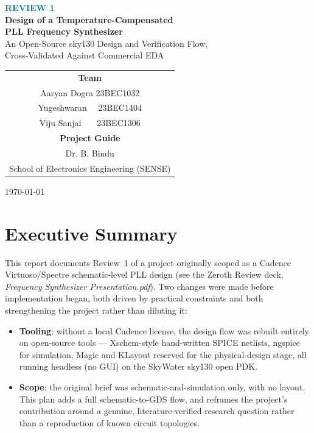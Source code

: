 \documentclass[11pt]{article}
\begin{document}
\begin{titlepage}
\centering
\vspace*{1.5cm}
{\small\textcolor{teal}{\bfseries REVIEW 1}}\\[0.3cm]
{\Huge\bfseries\color{navy} Design of a Temperature-Compensated\\[0.2cm] PLL Frequency Synthesizer}\\[0.5cm]
{\Large An Open-Source sky130 Design and Verification Flow,\\ Cross-Validated Against Commercial EDA}\\[1.5cm]

\begin{tabular}{c}
\textbf{Team} \\[0.2cm]
Aaryan Dogra \quad 23BEC1032 \\
Yugeshwaran \quad\ \ 23BEC1404 \\
Viju Sanjai \quad\ \ \ 23BEC1306 \\[0.4cm]
\textbf{Project Guide} \\
Dr. B. Bindu \\[0.2cm]
School of Electronics Engineering (SENSE)
\end{tabular}

\vfill
{\small \today}
\end{titlepage}

\tableofcontents
\newpage

\section{Executive Summary}

This report documents Review~1 of a project originally scoped as a Cadence Virtuoso/Spectre schematic-level PLL design (see the Zeroth Review deck, \emph{Frequency Synthesizer Presentation.pdf}). Two changes were made before implementation began, both driven by practical constraints and both strengthening the project rather than diluting it:

\begin{itemize}[leftmargin=1.5em]
  \item \textbf{Tooling}: without a local Cadence license, the design flow was rebuilt entirely on open-source tools --- Xschem-style hand-written SPICE netlists, ngspice for simulation, Magic and KLayout reserved for the physical-design stage, all running headless (no GUI) on the SkyWater sky130 open PDK.
  \item \textbf{Scope}: the original brief was schematic-and-simulation only, with no layout. This plan adds a full schematic-to-GDS flow, and reframes the project's contribution around a genuine, literature-verified research question rather than a reproduction of known circuit topologies.
\end{itemize}
\end{document}
